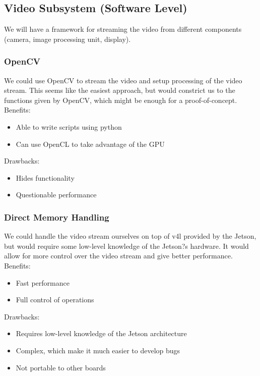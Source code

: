 \subsection{Video Subsystem (Software Level)}
We will have a framework for streaming the video from different components (camera, image processing unit, display).\\
	
	\subsubsection{OpenCV}
	We could use OpenCV to stream the video and setup processing of the video stream. This seems like the easiest approach, but would constrict us to the functions given by OpenCV, which might be enough for a proof-of-concept.\\
		
	Benefits:
	\begin{itemize}[leftmargin=2cm,labelindent=2cm]
		\item Able to write scripts using python
		\item Can use OpenCL to take advantage of the GPU
	\end{itemize}
	
	Drawbacks:
	\begin{itemize}[leftmargin=2cm,labelindent=2cm]
		\item Hides functionality
		\item Questionable performance\\
	\end{itemize}
	
	\subsubsection{Direct Memory Handling}
	We could handle the video stream ourselves on top of v4l provided by the Jetson, but would require some low-level knowledge of the Jetson?s hardware. It would allow for more control over the video stream and give better performance.\\
	
	Benefits:
	\begin{itemize}[leftmargin=2cm,labelindent=2cm]
		\item Fast performance
		\item Full control of operations
	\end{itemize}
	
	Drawbacks:
	\begin{itemize}[leftmargin=2cm,labelindent=2cm]
		\item Requires low-level knowledge of the Jetson architecture
		\item Complex, which make it much easier to develop bugs
		\item Not portable to other boards\\
	\end{itemize}
	
